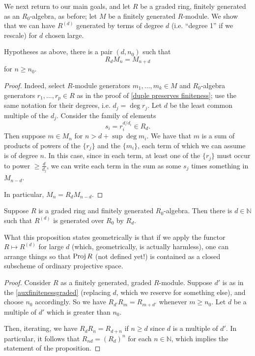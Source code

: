 We next return to our main goals, and let $R$ be a graded ring, finitely
generated as an $R_0$-algebra, as before; let $M$ be a finitely
generated $R$-module. We show that we can have $R^{(d)}$ generated by terms of degree $d$ (i.e.
``degree 1'' if we rescale) for $d$ chosen large.
\begin{lemma} 
Hypotheses as above, there is a pair $(d, n_0)$ such that
\[  R_d M_n = M_{n+d}  \]
for $n \geq n_0$.
\end{lemma} 
\begin{proof} 
Indeed, select $R$-module generators $m_1, \dots, m_k \in M$ and
$R_0$-algebra generators $r_1, \dots, r_p \in R$
as in the proof of \cref{duple preserves finiteness}; use the same
notation for their degrees, i.e. $d_j = \deg r_j$.
Let $d $ be the least common multiple of the $d_j$.  Consider the family of
elements
\[  s_i = r_i^{d/d_i} \in R_d. \]
Then suppose $m \in M_n$ for $n>d + \sup \deg m_i$.  We have that $m$ is a sum
of products of powers of the $\{r_j\}$ and the $\{m_i\}$, each term of which we can assume
is
of degree $n$.  In this case, since in each term, at least one
of the $\{r_j\}$ must occur to power $\geq \frac{d}{d_j}$, we can write each term
in the sum as some $s_j$ times something in $M_{n-d}$. 

In particular,
\( M_n  = R_d M_{n-d}.  \)
\end{proof} 

\begin{proposition} \label{auxfinitenessgraded}
Suppose $R$ is a graded ring and finitely generated $R_0$-algebra. Then there
is $d \in \mathbb{N}$ such that $R^{(d)}$ is generated over $R_0$ by $R_d$.
\end{proposition} 
What this proposition states geometrically is that if we apply the
functor $R \mapsto R^{(d)}$ for large $d$ (which, geometrically, is actually
harmless), one can arrange things so that $\operatorname{Proj} R$ (not defined yet!) is
contained as a closed subscheme of ordinary projective space.

\begin{proof} Consider $R$ as a finitely generated, graded $R$-module.
Suppose $d'$ is as in the \cref{auxfinitenessgraded} (replacing $d$, which we reserve for
something else), and choose $n_0$ accordingly.
So we have $R_{d'} R_{m} = R_{m + d'}$ whenever $m \geq n_0$.
Let $d$ be a multiple of $d'$
which is greater than $n_0$.

Then, iterating, we have $R_d R_n = R_{d+n}$ if $n \geq d$ since $d$ is a multiple of $d'$.
In particular, it follows that $R_{nd} = (R_d)^n$ for each $n \in \mathbb{N}$,
which implies the statement of the proposition.
\end{proof} 

